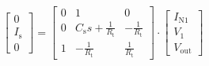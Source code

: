 \begin{equation}
\left[\begin{matrix}0\\I_{\mathrm{s}}\\0\end{matrix}\right]=\left[\begin{matrix}0 & 1 & 0\\0 & C_{\mathrm{s}} s + \frac{1}{R_{\mathrm{t}}} & - \frac{1}{R_{\mathrm{t}}}\\1 & - \frac{1}{R_{\mathrm{t}}} & \frac{1}{R_{\mathrm{t}}}\end{matrix}\right]\cdot \left[\begin{matrix}I_{\mathrm{N1}}\\V_{1}\\V_{\mathrm{out}}\end{matrix}\right]
\end{equation}

